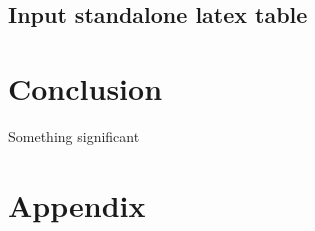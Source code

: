 \documentclass[12pt,]{article}
\begin{document}
\subsection{Input standalone latex
table}\label{input-standalone-latex-table}

\vspace{5mm}  \vspace{5mm}

\section{Conclusion}\label{conclusion}

Something significant

\section{Appendix}\label{appendix}




\newpage
\singlespacing
\printbibliography[title=Bibliography]
\end{document}
